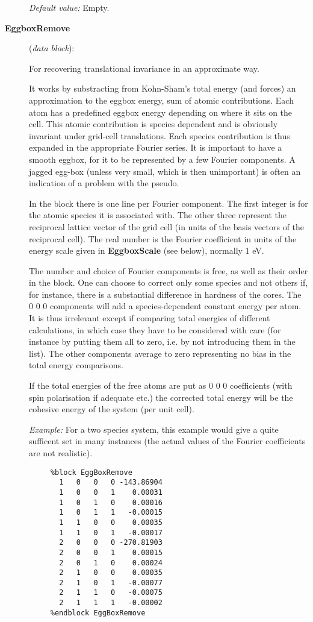 \documentclass[11pt]{article}
\begin{document}
\begin{description}
{\it Default value:} Empty.


\item[{\bf EggboxRemove}] ({\it data block}):

For recovering translational invariance in an approximate way.

It works by substracting from Kohn-Sham's total energy (and forces) an
approximation to the eggbox energy, sum of atomic contributions.
Each atom has a predefined eggbox energy depending on where it sits on
the cell. This atomic contribution is species dependent and is
obviously invariant under grid-cell translations. Each species
contribution is thus expanded in the appropriate Fourier series.
It is important to have a smooth eggbox, for it to
be represented by a few Fourier components. A jagged egg-box (unless
very small, which is then unimportant) is often an
indication of a problem with the pseudo.

In the block there is one line per Fourier component. The first integer
is for the atomic species it is associated with. The other three
represent the reciprocal lattice vector of the grid cell (in units
of the basis vectors of the reciprocal cell). The real number is
the Fourier coefficient in units of the energy scale given in
{\bf EggboxScale} (see below), normally 1 eV.

The number and choice of Fourier components is free, as well as their
order in the block. One can choose to correct only some species and not
others if, for instance, there is a substantial difference in hardness
of the cores. The 0 0 0 components will add a species-dependent
constant energy per atom. It is thus irrelevant except if comparing
total energies of different calculations, in which case they
have to be considered with care (for instance by putting them all to zero,
i.e. by not introducing them in the list).
The other components average to zero representing no bias in the
total energy comparisons.

If the total
energies of the free atoms are put as 0 0 0 coefficients (with
spin polarisation if adequate etc.) the corrected total energy
will be the cohesive energy of the system (per unit cell).

{\it Example:} For a two species system, this example would give a quite
sufficent set in many instances (the actual values of the Fourier
coefficients are not realistic).

\begin{verbatim}
     %block EggBoxRemove
       1   0   0   0 -143.86904
       1   0   0   1    0.00031
       1   0   1   0    0.00016
       1   0   1   1   -0.00015
       1   1   0   0    0.00035
       1   1   0   1   -0.00017
       2   0   0   0 -270.81903
       2   0   0   1    0.00015
       2   0   1   0    0.00024
       2   1   0   0    0.00035
       2   1   0   1   -0.00077
       2   1   1   0   -0.00075
       2   1   1   1   -0.00002
     %endblock EggBoxRemove
\end{verbatim}


\end{description}
\end{document}
